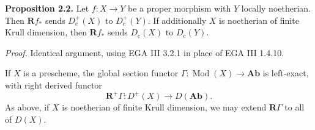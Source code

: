 \setcounter{page}{89}
\textbf{Proposition 2.2.}
Let $f\colon X\to Y$ be a proper morphism with $Y$ locally noetherian.
Then $\mathbf{R}f_*$ sends $D_{\mathrm{c}}^+(X)$ to $D_{\mathrm{c}}^+(Y)$.
If additionally $X$ is noetherian of finite Krull dimension, then $\mathbf{R}f_*$ sends $D_{\mathrm{c}}(X)$ to $D_{\mathrm{c}}(Y)$.

\textit{Proof.}
Identical argument, using EGA III 3.2.1 in place of EGA III 1.4.10.

If $X$ is a prescheme, the global section functor $\Gamma\colon\operatorname{Mod}(X)\to\mathbf{Ab}$ is left-exact, with right derived functor
\[
\mathbf{R}^+\Gamma\colon D^+(X)\to D(\mathbf{Ab}).
\]
As above, if $X$ is noetherian of finite Krull dimension, we may extend $\mathbf{R}\Gamma$ to all of $D(X)$.